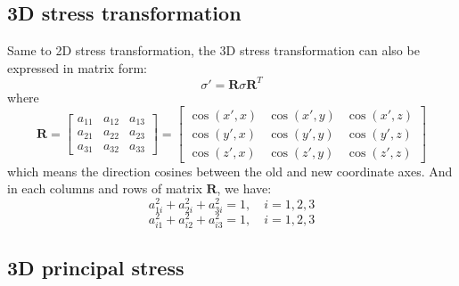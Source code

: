 \documentclass[en,hazy,cyan,8pt,normal]{elegantnote}
\begin{document}
  \subsection{3D stress transformation}
    Same to 2D stress transformation, the 3D stress transformation can also be expressed in matrix form:
    \begin{equation}\label{eq:019}
      \sigma'=\mathbf{R}\sigma \mathbf{R}^T
    \end{equation}
    where
    \begin{equation}\label{eq:020}
      \mathbf{R} =
        \begin{bmatrix}
        a_{11} & a_{12} & a_{13} \\
        a_{21} & a_{22} & a_{23} \\
        a_{31} & a_{32} & a_{33}
        \end{bmatrix}
        =
        \begin{bmatrix}
        \cos(x', x) & \cos(x', y) & \cos(x', z) \\
        \cos(y', x) & \cos(y', y) & \cos(y', z) \\
        \cos(z', x) & \cos(z', y) & \cos(z', z)
        \end{bmatrix}
    \end{equation}
    which means the direction cosines between the old and new coordinate axes.
    And in each columns and rows of matrix $\mathbf{R}$, we have:
    \begin{equation}\label{eq:021}
      a_{1i}^2 + a_{2i}^2 + a_{3i}^2 = 1, \quad i=1,2,3
    \end{equation}
    \begin{equation}\label{eq:022}
      a_{i1}^2 + a_{i2}^2 + a_{i3}^2 = 1, \quad i=1,2,3
    \end{equation}

  \subsection{3D principal stress}
\end{document}
